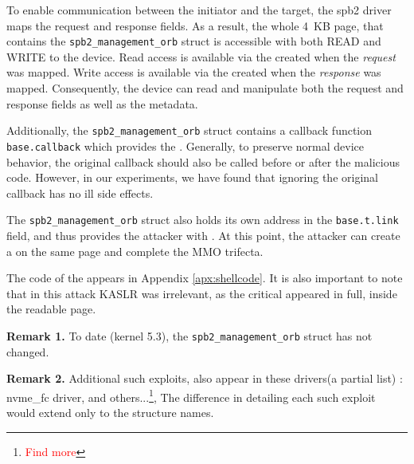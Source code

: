 To enable communication between the initiator and the target, the spb2 driver maps the request and response fields. As a result, the whole 4~KB page, that contains the \texttt{spb2\_management\_orb} struct is accessible with both READ and WRITE to the device. Read access is available via the \iova{} created when the \emph{request} was mapped. Write access is available via the \iova{} created when the \emph{response} was mapped. Consequently, the device can read and manipulate both the request and response fields as well as the metadata. 

Additionally, the \texttt{spb2\_management\_orb} struct contains a callback function \texttt{base.callback} which provides the \oportunity{}. Generally, to preserve normal device behavior, the original callback should also be called before or after the malicious code. However, in our experiments, we have found that ignoring the original callback has no ill side effects. 

The \texttt{spb2\_management\_orb} struct also holds its own address in the \texttt{base.t.link} field, and thus provides the attacker with \means{}. At this point, the attacker can create a \mabaf{} on the same page and complete the MMO trifecta. 

The code of the \mabaf{} appears in Appendix \ref{apx:shellcode}. It is also important to note that in this attack KASLR was irrelevant, as the critical \kva{} appeared in full, inside the readable page.

\smallskip
\noindent \textbf{Remark 1.} To date (kernel 5.3), the \texttt{spb2\_management\_orb} struct has not changed.

\smallskip
\noindent \textbf{Remark 2.} Additional such exploits, also appear in these drivers(a partial list) : nvme\_fc driver, and others...\footnote{\textcolor{red}{Find more}},
The difference in detailing each such exploit would extend only to the structure names. 